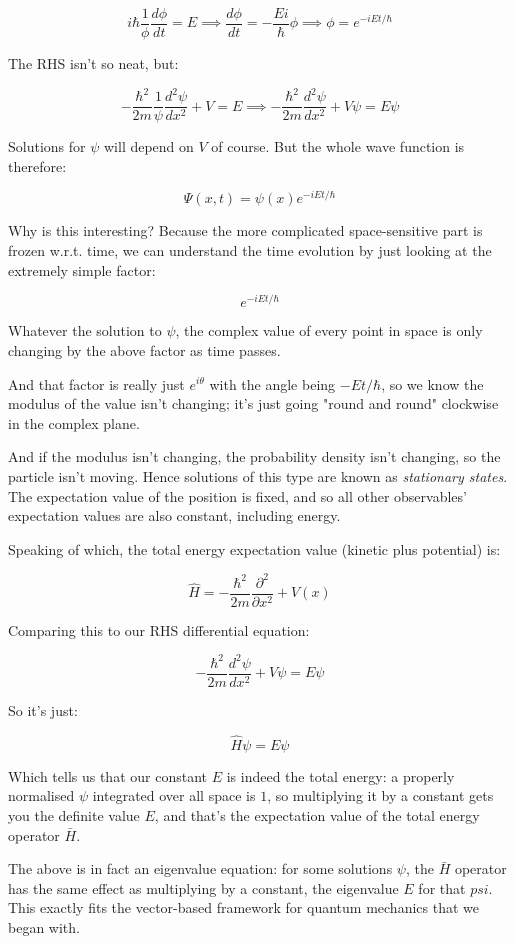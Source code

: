 $$
i\hbar
\frac{1}{\phi}
\frac{d \phi}{d t}
= E
\implies
\frac{d \phi}{d t}
=
- \frac{Ei}{\hbar}
\phi
\implies
\phi = e^{-iEt/\hbar}
$$

The RHS isn't so neat, but:

$$
- \frac{\hbar^2}{2m}
\frac{1}{\psi}
\frac{d^2 \psi}{d x^2}
+ V
=
E
\implies
- \frac{\hbar^2}{2m}
\frac{d^2 \psi}{d x^2}
+ V\psi
=
E\psi
$$

Solutions for $\psi$ will depend on $V$ of course. But the whole wave function is therefore:

$$\Psi(x, t) = \psi(x) e^{-iEt/\hbar}$$

Why is this interesting? Because the more complicated space-sensitive part is frozen w.r.t. time, we can understand the time evolution by just looking at the extremely simple factor:

$$
e^{-iEt/\hbar}
$$

Whatever the solution to $\psi$, the complex value of every point in space is only changing by the above factor as time passes.

And that factor is really just $e^{i\theta}$ with the angle being $-Et/\hbar$, so we know the modulus of the value isn't changing; it's just going "round and round" clockwise in the complex plane.

And if the modulus isn't changing, the probability density isn't changing, so the particle isn't moving. Hence solutions of this type are known as \textit{stationary states}. The expectation value of the position is fixed, and so all other observables' expectation values are also constant, including energy.

Speaking of which, the total energy expectation value (kinetic plus potential) is:

$$
\hat{H} =
-\frac{\hbar^2}{2m}
\frac{\partial^2}{\partial x^2}
+ V(x)
$$

Comparing this to our RHS differential equation:

$$
- \frac{\hbar^2}{2m}
\frac{d^2 \psi}{d x^2}
+ V\psi
=
E\psi
$$

So it's just:

$$
\hat{H}\psi
=
E\psi
$$

Which tells us that our constant $E$ is indeed the total energy: a properly normalised $\psi$ integrated over all space is $1$, so multiplying it by a constant gets you the definite value $E$, and that's the expectation value of the total energy operator $\bar{H}$.

The above is in fact an eigenvalue equation: for some solutions $\psi$, the $\bar{H}$ operator has the same effect as multiplying by a constant, the eigenvalue $E$ for that $psi$. This exactly fits the vector-based framework for quantum mechanics that we began with.

